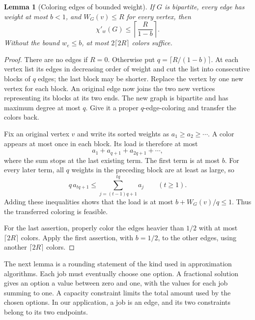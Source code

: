 \documentclass[11pt]{article}
\newtheorem{lemma}[theorem]{Lemma}
\theoremstyle{definition}\newtheorem{algorithm}{Algorithm}[section]
\numberwithin{equation}{section}
\theoremstyle{remark}\newtheorem*{remark}{Remark}
\begin{document}
\begin{lemma}[Coloring edges of bounded weight]\label{lem:cleanup}
If $G$ is bipartite, every edge has weight at most $b<1$, and
$W_G(v)\le R$ for every vertex, then
\[
 \chi'_w(G)\le\left\lceil\frac{R}{1-b}\right\rceil.
\]
Without the bound $w_e\le b$, at most $2\lceil2R\rceil$ colors suffice.
\end{lemma}
\begin{proof}
There are no edges if $R=0$. Otherwise put $q=\lceil R/(1-b)\rceil$.
At each vertex list its edges in decreasing order of weight and cut the
list into consecutive blocks of $q$ edges; the last block may be shorter.
Replace the vertex by one new vertex for each block. An original edge now
joins the two new vertices representing its blocks at its two ends.
The new graph is bipartite and has maximum degree at most $q$. Give it
a proper $q$-edge-coloring and transfer the colors back.

Fix an original vertex $v$ and write its sorted weights as
$a_1\ge a_2\ge\cdots$. A color appears at most once in each block.
Its load is therefore at most
\[
 a_1+a_{q+1}+a_{2q+1}+\cdots,
\]
where the sum stops at the last existing term. The first term is at most
$b$. For every later term, all $q$ weights in the preceding block are
at least as large, so
\[
 q\,a_{tq+1}\le\sum_{j=(t-1)q+1}^{tq}a_j\qquad(t\ge1).
\]
Adding these inequalities shows that the load is at most
$b+W_G(v)/q\le1$. Thus the transferred coloring is feasible.

For the last assertion, properly color the edges heavier than $1/2$
with at most $\lceil2R\rceil$ colors. Apply the first assertion, with
$b=1/2$, to the other edges, using another $\lceil2R\rceil$ colors.
\end{proof}






The next lemma is a rounding statement of the kind used in approximation
algorithms. Each job must eventually choose one option. A fractional
solution gives an option a value between zero and one, with the values
for each job summing to one. A capacity constraint limits the total
amount used by the chosen options. In our application, a job is an edge,
and its two constraints belong to its two endpoints.
\end{document}
